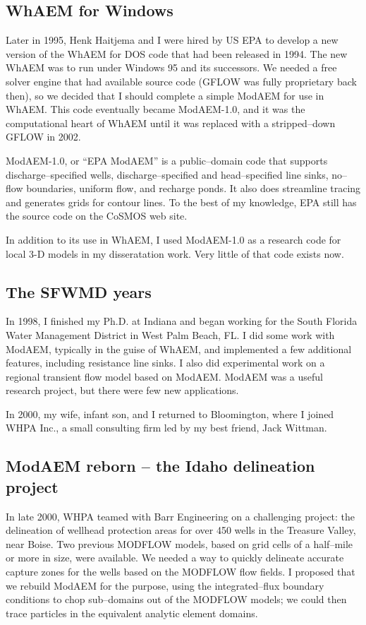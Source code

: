 \subsection*{WhAEM for Windows}

Later in 1995, Henk Haitjema and I were hired by US EPA to develop
a new version of the WhAEM for DOS code that had been released in
1994. The new WhAEM was to run under Windows 95 and its successors.
We needed a free solver engine that had available source code (GFLOW
was fully proprietary back then), so we decided that I should complete
a simple ModAEM for use in WhAEM. This code eventually became ModAEM-1.0,
and it was the computational heart of WhAEM until it was replaced
with a stripped--down GFLOW in 2002.

ModAEM-1.0, or ``EPA ModAEM'' is a public--domain code that supports
discharge--specified wells, discharge--specified and head--specified
line sinks, no--flow boundaries, uniform flow, and recharge ponds.
It also does streamline tracing and generates grids for contour lines.
To the best of my knowledge, EPA still has the source code on the
CoSMOS web site.

In addition to its use in WhAEM, I used ModAEM-1.0 as a research code
for local 3-D models in my disseratation work. Very little of that
code exists now.

\subsection*{The SFWMD years}

In 1998, I finished my Ph.D. at Indiana and began working for the
South Florida Water Management District in West Palm Beach, FL. I
did some work with ModAEM, typically in the guise of WhAEM, and implemented
a few additional features, including resistance line sinks. I also
did experimental work on a regional transient flow model based on
ModAEM. ModAEM was a useful research project, but there were few new
applications. 

In 2000, my wife, infant son, and I returned to Bloomington, where
I joined WHPA Inc., a small consulting firm led by my best friend,
Jack Wittman.

\subsection*{ModAEM reborn -- the Idaho delineation project}

In late 2000, WHPA teamed with Barr Engineering on a challenging project:
the delineation of wellhead protection areas for over 450 wells in
the Treasure Valley, near Boise. Two previous MODFLOW models, based
on grid cells of a half--mile or more in size, were available. We
needed a way to quickly delineate accurate capture zones for the wells
based on the MODFLOW flow fields. I proposed that we rebuild ModAEM
for the purpose, using the integrated--flux boundary conditions to
chop sub--domains out of the MODFLOW models; we could then trace particles
in the equivalent analytic element domains. 

